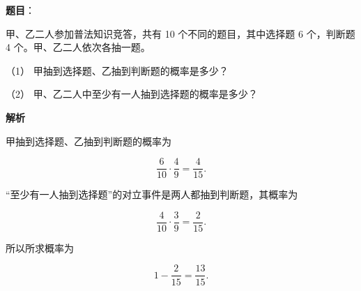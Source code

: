\begin{answer}

\textbf{题目}：

甲、乙二人参加普法知识竞答，共有 10 个不同的题目，其中选择题 6 个，判断题 4 个。甲、乙二人依次各抽一题。

（1） 甲抽到选择题、乙抽到判断题的概率是多少？

（2） 甲、乙二人中至少有一人抽到选择题的概率是多少？

\textbf{解析}


甲抽到选择题、乙抽到判断题的概率为

\nopagebreak[4]
\[
\frac6{10}\cdot\frac4{9}=\frac4{15}.
\]


“至少有一人抽到选择题”的对立事件是两人都抽到判断题，其概率为

\nopagebreak[4]
\[
\frac4{10}\cdot\frac3{9}=\frac2{15}.
\]

所以所求概率为

\nopagebreak[4]
\[
1-\frac2{15}=\frac{13}{15}.
\]



\end{answer}
